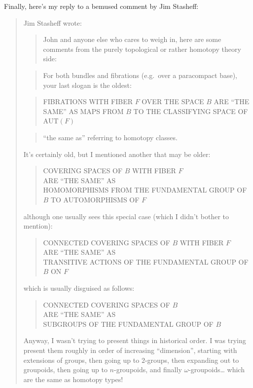 \documentclass{article}
\begin{document}
Finally, here's my reply to a bemused comment by Jim Stasheff:

\begin{quote}
Jim Stasheff wrote:

\begin{quote}
John and anyone else who cares to weigh in, here are some comments from
the purely topological or rather homotopy theory side:
\end{quote}

\begin{quote}
For both bundles and fibrations (e.g.~over a paracompact base), your
last slogan is the oldest:
\end{quote}

\begin{quote}
FIBRATIONS WITH FIBER \(F\) OVER THE SPACE \(B\) ARE ``THE SAME'' AS
MAPS FROM \(B\) TO THE CLASSIFYING SPACE OF \(\mathrm{AUT}(F)\)
\end{quote}

\begin{quote}
``the same as'' referring to homotopy classes.
\end{quote}

It's certainly old, but I mentioned another that may be older:

\begin{quote}
COVERING SPACES OF \(B\) WITH FIBER \(F\)\\
ARE ``THE SAME'' AS\\
HOMOMORPHISMS FROM THE FUNDAMENTAL GROUP OF \(B\) TO AUTOMORPHISMS OF
\(F\)
\end{quote}

although one usually sees this special case (which I didn't bother to
mention):

\begin{quote}
CONNECTED COVERING SPACES OF \(B\) WITH FIBER \(F\)\\
ARE ``THE SAME'' AS\\
TRANSITIVE ACTIONS OF THE FUNDAMENTAL GROUP OF \(B\) ON \(F\)
\end{quote}

which is usually disguised as follows:

\begin{quote}
CONNECTED COVERING SPACES OF \(B\)\\
ARE ``THE SAME'' AS\\
SUBGROUPS OF THE FUNDAMENTAL GROUP OF \(B\)
\end{quote}

Anyway, I wasn't trying to present things in historical order. I was
trying present them roughly in order of increasing ``dimension'',
starting with extensions of groups, then going up to \(2\)-groups, then
expanding out to groupoids, then going up to \(n\)-groupoids, and
finally \(\omega\)-groupoids\ldots{} which are the same as homotopy
types!


\end{quote}
\end{document}
